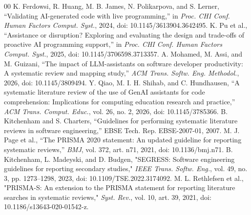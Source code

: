 \documentclass[conference]{IEEEtran}
\begin{document}
\begin{thebibliography}{00}
 K. Ferdowsi, R. Huang, M. B. James, N. Polikarpova, and S. Lerner, ``Validating AI-generated code with live programming,'' in \textit{Proc. CHI Conf. Human Factors Comput. Syst.}, 2024, doi: 10.1145/3613904.3642495.
 K. Pu et al., ``Assistance or disruption? Exploring and evaluating the design and trade-offs of proactive AI programming support,'' in \textit{Proc. CHI Conf. Human Factors Comput. Syst.}, 2025, doi: 10.1145/3706598.3713357.
 A. Mohamed, M. Assi, and M. Guizani, ``The impact of LLM-assistants on software developer productivity: A systematic review and mapping study,'' \textit{ACM Trans. Softw. Eng. Methodol.}, 2026, doi: 10.1145/3809494.
 Y. Qiao, M. I. H. Shihab, and C. Hundhausen, ``A systematic literature review of the use of GenAI assistants for code comprehension: Implications for computing education research and practice,'' \textit{ACM Trans. Comput. Educ.}, vol. 26, no. 2, 2026, doi: 10.1145/3785366.
 B. Kitchenham and S. Charters, ``Guidelines for performing systematic literature reviews in software engineering,'' EBSE Tech. Rep. EBSE-2007-01, 2007.
 M. J. Page et al., ``The PRISMA 2020 statement: An updated guideline for reporting systematic reviews,'' \textit{BMJ}, vol. 372, art. n71, 2021, doi: 10.1136/bmj.n71.
 B. Kitchenham, L. Madeyski, and D. Budgen, "SEGRESS: Software engineering guidelines for reporting secondary studies," \textit{IEEE Trans. Softw. Eng.}, vol. 49, no. 3, pp. 1273--1298, 2023, doi: 10.1109/TSE.2022.3174092.
 M. L. Rethlefsen et al., "PRISMA-S: An extension to the PRISMA statement for reporting literature searches in systematic reviews," \textit{Syst. Rev.}, vol. 10, art. 39, 2021, doi: 10.1186/s13643-020-01542-z.
\end{thebibliography}
\end{document}
